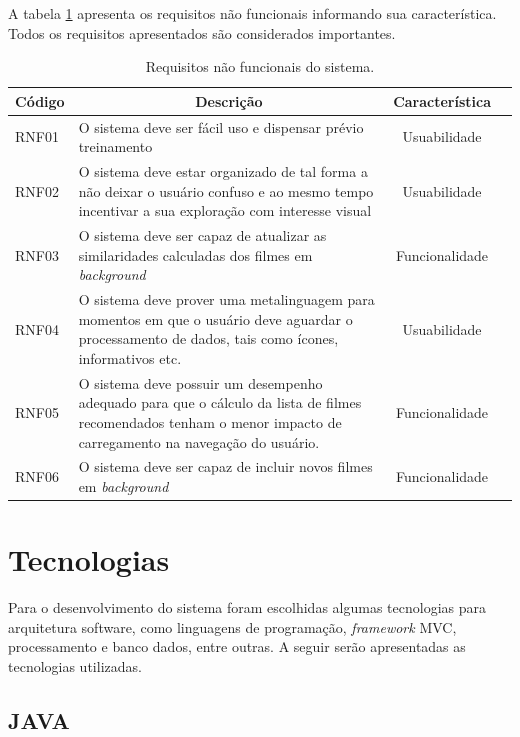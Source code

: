 A tabela \ref{tab:req-nao-funcionais} apresenta os requisitos não funcionais informando sua característica. Todos os requisitos apresentados são considerados importantes.

\begin{table}[H]
	\label{tab:req-nao-funcionais}
	\centering
	\caption{Requisitos não funcionais do sistema.}
	\def\arraystretch{1.3} %
	\begin{tabular}{| m{1.3cm} | m{9.4cm}| c | m{2cm}}
		\hline
		\multicolumn{1}{|c|}{\bfseries Código} & \multicolumn{1}{c|}{\bfseries Descrição} & \multicolumn{1}{c|}{\bfseries Característica} \\ \hline
		RNF01	& O sistema deve ser fácil uso e dispensar prévio treinamento	& Usuabilidade \\ \hline
		RNF02	& O sistema deve estar organizado de tal forma a não deixar o usuário confuso e ao mesmo tempo incentivar a sua exploração com interesse visual	& Usuabilidade \\ \hline
		RNF03	& O sistema deve ser capaz de atualizar as similaridades calculadas dos filmes em \textit{background}	& Funcionalidade \\ \hline
		RNF04	& O sistema deve prover uma metalinguagem para momentos em que o usuário deve aguardar o processamento de dados, tais como ícones, informativos etc.	& Usuabilidade \\ \hline
		RNF05	& O sistema deve possuir um desempenho adequado para que o cálculo da lista de filmes recomendados tenham o menor impacto de carregamento na navegação do usuário.	& Funcionalidade \\ \hline
		RNF06	& O sistema deve ser capaz de incluir novos filmes em \textit{background}	& Funcionalidade \\ \hline
	\end{tabular}
\end{table}

\section{Tecnologias}

Para o desenvolvimento do sistema foram escolhidas algumas tecnologias para arquitetura software, como linguagens de programação, \textit{framework} \ac{MVC}, processamento e banco dados, entre outras. A seguir serão apresentadas as tecnologias utilizadas.

\subsection{JAVA}


